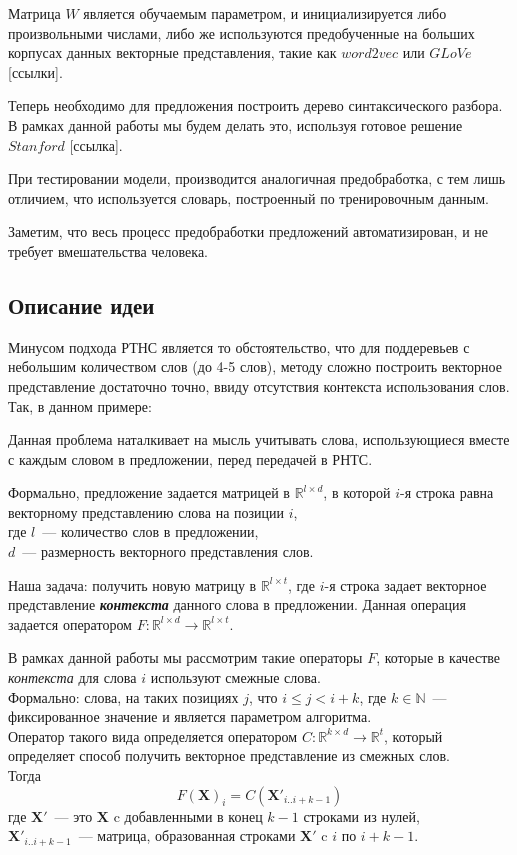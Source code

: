 Матрица $W$ является обучаемым параметром, и инициализируется либо произвольными числами, 
либо же используются предобученные на больших корпусах данных векторные представления, 
такие как $word2vec$ или $GLoVe$ [ссылки].

Теперь необходимо для предложения построить дерево синтаксического разбора.
В рамках данной работы мы будем делать это, используя готовое решение $Stanford$ [ссылка].

При тестировании модели, производится аналогичная предобработка, 
с тем лишь отличием, что используется словарь, построенный по тренировочным данным.

Заметим, что весь процесс предобработки предложений автоматизирован, 
и не требует вмешательства человека.

\subsection{Описание идеи }
Минусом подхода РТНС является то обстоятельство, что для поддеревьев с небольшим количеством слов (до 4-5 слов), методу сложно построить векторное представление достаточно точно, 
ввиду отсутствия контекста использования слов. Так, в данном примере:


Данная проблема наталкивает на мысль учитывать слова, использующиеся вместе с каждым словом в предложении,
перед передачей в РНТС.

Формально, предложение задается матрицей в  $\mathbb{R}^{l \times{} d}$, в которой $i$-я строка равна векторному представлению слова на позиции $i$,\\
где $l$~--- количество слов в предложении,\\
$d$~--- размерность векторного представления слов. 

Наша задача: получить новую матрицу в $\mathbb{R}^{l \times {} t}$, где $i$-я строка задает векторное представление \textbf{\textit{контекста}} данного слова в предложении. 
Данная операция задается оператором $F:\mathbb{R}^{l \times d} \to \mathbb{R}^{l \times t}$.

В рамках данной работы мы рассмотрим такие операторы $F$, которые в качестве \textit{контекста} 
для слова $i$ используют смежные слова.\\
Формально: слова, на таких позициях $j$, что $i \le j < i + k$, где $k \in \mathbb{N}$~--- фиксированное значение и является параметром алгоритма.\\Оператор такого вида определяется оператором
$C:\mathbb{R}^{k \times d} \to \mathbb{R}^t$, который определяет способ 
получить векторное представление из смежных слов. \\
Тогда $$F(\pmb{X})_i = C(\pmb{X}'_{i..i+k-1})$$
где $\textbf{X}'$~--- это $\textbf{X}$ c добавленными в конец $k-1$ строками из нулей, \\
$\pmb{X}'_{i..i+k-1}$~--- матрица, образованная строками $\pmb{X}'$ c $i$ по $i+k-1$.\par

